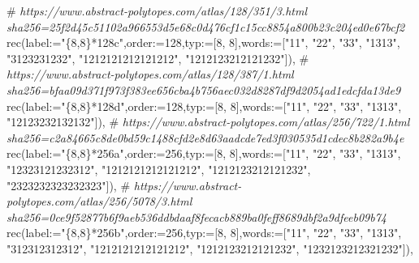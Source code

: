 \documentclass[
  10pt,
  letterpaper,
]{article}
\newenvironment{Shaded}{}{}
\newcommand{\CommentTok}[1]{\textcolor[rgb]{0.38,0.63,0.69}{\textit{#1}}}
\newcommand{\ExtensionTok}[1]{#1}
\newcommand{\FloatTok}[1]{\textcolor[rgb]{0.25,0.63,0.44}{#1}}
\newcommand{\NormalTok}[1]{#1}
\newcommand{\OperatorTok}[1]{\textcolor[rgb]{0.40,0.40,0.40}{#1}}
\newcommand{\StringTok}[1]{\textcolor[rgb]{0.25,0.44,0.63}{#1}}
\newcommand{\VariableTok}[1]{\textcolor[rgb]{0.10,0.09,0.49}{#1}}
\begin{document}
\begin{Shaded}
\begin{Highlighting}[]
\NormalTok{\#}\CommentTok{ https://www.abstract{-}polytopes.com/atlas/128/351/3.html sha256=25f2d45c51102a966553d5e68c0d476cf1c15cc8854a800b23c204ed0e67bcf2}
\ExtensionTok{rec}\NormalTok{(}\VariableTok{label}\OperatorTok{:=}\StringTok{"\{8,8\}*128c"}\OperatorTok{,}\VariableTok{order}\OperatorTok{:=}\FloatTok{128}\OperatorTok{,}\VariableTok{typ}\OperatorTok{:=}\NormalTok{[}\FloatTok{8}\OperatorTok{,} \FloatTok{8}\NormalTok{]}\OperatorTok{,}\VariableTok{words}\OperatorTok{:=}\NormalTok{[}\StringTok{"11"}\OperatorTok{,} \StringTok{"22"}\OperatorTok{,} \StringTok{"33"}\OperatorTok{,} \StringTok{"1313"}\OperatorTok{,} \StringTok{"3123231232"}\OperatorTok{,} \StringTok{"1212121212121212"}\OperatorTok{,} \StringTok{"1212123212121232"}\NormalTok{])}\OperatorTok{,}
\NormalTok{\#}\CommentTok{ https://www.abstract{-}polytopes.com/atlas/128/387/1.html sha256=bfaa09d371f973f383ee656cba4b756aec032d8287df9d2054ad1edcfda13de9}
\ExtensionTok{rec}\NormalTok{(}\VariableTok{label}\OperatorTok{:=}\StringTok{"\{8,8\}*128d"}\OperatorTok{,}\VariableTok{order}\OperatorTok{:=}\FloatTok{128}\OperatorTok{,}\VariableTok{typ}\OperatorTok{:=}\NormalTok{[}\FloatTok{8}\OperatorTok{,} \FloatTok{8}\NormalTok{]}\OperatorTok{,}\VariableTok{words}\OperatorTok{:=}\NormalTok{[}\StringTok{"11"}\OperatorTok{,} \StringTok{"22"}\OperatorTok{,} \StringTok{"33"}\OperatorTok{,} \StringTok{"1313"}\OperatorTok{,} \StringTok{"12123232132132"}\NormalTok{])}\OperatorTok{,}
\NormalTok{\#}\CommentTok{ https://www.abstract{-}polytopes.com/atlas/256/722/1.html sha256=c2a84665c8de0bd59c1488cfd2e8d63aadcde7ed3f030535d1cdec8b282a9b4e}
\ExtensionTok{rec}\NormalTok{(}\VariableTok{label}\OperatorTok{:=}\StringTok{"\{8,8\}*256a"}\OperatorTok{,}\VariableTok{order}\OperatorTok{:=}\FloatTok{256}\OperatorTok{,}\VariableTok{typ}\OperatorTok{:=}\NormalTok{[}\FloatTok{8}\OperatorTok{,} \FloatTok{8}\NormalTok{]}\OperatorTok{,}\VariableTok{words}\OperatorTok{:=}\NormalTok{[}\StringTok{"11"}\OperatorTok{,} \StringTok{"22"}\OperatorTok{,} \StringTok{"33"}\OperatorTok{,} \StringTok{"1313"}\OperatorTok{,} \StringTok{"12323121232312"}\OperatorTok{,} \StringTok{"1212121212121212"}\OperatorTok{,} \StringTok{"1212123212121232"}\OperatorTok{,} \StringTok{"2323232323232323"}\NormalTok{])}\OperatorTok{,}
\NormalTok{\#}\CommentTok{ https://www.abstract{-}polytopes.com/atlas/256/5078/3.html sha256=0ce9f52877b6f9aeb536ddbdaaf8fecacb889ba0feff8689dbf2a9dfeeb09b74}
\ExtensionTok{rec}\NormalTok{(}\VariableTok{label}\OperatorTok{:=}\StringTok{"\{8,8\}*256b"}\OperatorTok{,}\VariableTok{order}\OperatorTok{:=}\FloatTok{256}\OperatorTok{,}\VariableTok{typ}\OperatorTok{:=}\NormalTok{[}\FloatTok{8}\OperatorTok{,} \FloatTok{8}\NormalTok{]}\OperatorTok{,}\VariableTok{words}\OperatorTok{:=}\NormalTok{[}\StringTok{"11"}\OperatorTok{,} \StringTok{"22"}\OperatorTok{,} \StringTok{"33"}\OperatorTok{,} \StringTok{"1313"}\OperatorTok{,} \StringTok{"312312312312"}\OperatorTok{,} \StringTok{"1212121212121212"}\OperatorTok{,} \StringTok{"1212123212121232"}\OperatorTok{,} \StringTok{"1232123212321232"}\NormalTok{])}\OperatorTok{,}

\end{Highlighting}
\end{Shaded}
\end{document}
